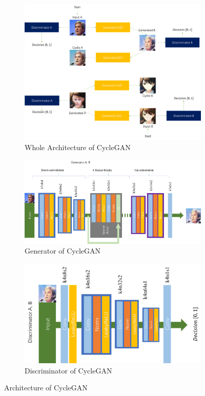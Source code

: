 \documentclass[10pt,twocolumn,letterpaper]{article}
\begin{document}
\begin{figure}[h]
   \centering
   \begin{subfigure}{.26\linewidth}
      \centering
      \includegraphics[width=.9\linewidth]{cyclegan-arch}
      \caption{Whole Architecture of CycleGAN}
   \end{subfigure}
   \begin{subfigure}{.36\linewidth}
      \centering
      \includegraphics[width=.9\linewidth]{cyclegan-g}
      \caption{Generator of CycleGAN}
   \end{subfigure}
   \begin{subfigure}{.36\linewidth}
      \centering
      \includegraphics[width=.9\linewidth]{cyclegan-d}
      \caption{Discriminator of CycleGAN}
   \end{subfigure}
   \caption{Architecture of CycleGAN}
   \label{fig:cyclegan-arch}
\end{figure}
\end{document}
